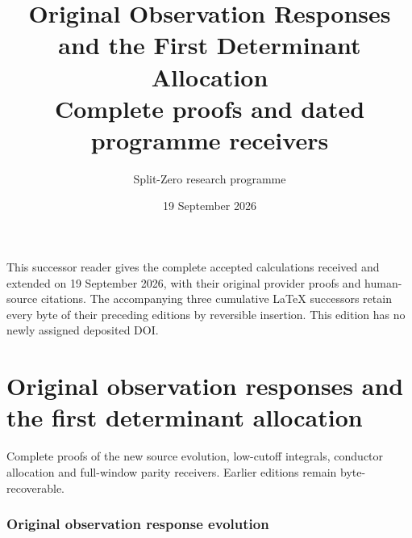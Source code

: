 \documentclass[11pt,a4paper]{article}
\title{Original Observation Responses and the First Determinant Allocation\\[0.6em]\large Complete proofs and dated programme receivers}
\author{Split-Zero research programme}
\date{19 September 2026}
\providecommand{\diag}{\operatorname{diag}}
\providecommand{\Tr}{\operatorname{Tr}}
\providecommand{\norm}[1]{\left\lVert#1\right\rVert}
\begin{document}
\maketitle
\noindent This successor reader gives the complete accepted calculations received and
extended on 19 September 2026, with their original provider proofs and
human-source citations. The accompanying three cumulative LaTeX successors
retain every byte of their preceding editions by reversible insertion.
This edition has no newly assigned deposited DOI.
\tableofcontents
\begingroup
\clearpage
\part{Original observation responses and the first determinant allocation}
\noindent Complete proofs of the new source evolution, low-cutoff integrals, conductor allocation and full-window parity receivers. Earlier editions remain byte-recoverable.
\providecommand{\tightlist}{\setlength{\itemsep}{0pt}\setlength{\parskip}{0pt}}
\providecommand{\C}{\mathbb C}\providecommand{\R}{\mathbb R}
\providecommand{\Z}{\mathbb Z}\providecommand{\Q}{\mathbb Q}
\providecommand{\N}{\mathbb N}
\providecommand{\im}{\operatorname{im}}
\providecommand{\diag}{\operatorname{diag}}
\providecommand{\Gr}{\operatorname{Gram}}
\providecommand{\Gram}{\operatorname{Gram}}
\providecommand{\Res}{\operatorname{Res}}
\providecommand{\cond}{\operatorname{cond}}
\providecommand{\ExtensionTok}[1]{#1}\providecommand{\NormalTok}[1]{#1}
\providecommand{\StringTok}[1]{#1}\providecommand{\BuiltInTok}[1]{#1}
\providecommand{\ControlFlowTok}[1]{#1}

\clearpage
\begingroup
\def\C{\mathbb C}
\def\im{\operatorname{im}}
\def\Tr{\operatorname{Tr}}
\def\norm#1{\left\lVert#1\right\rVert}

\setcounter{equation}{0}
\renewcommand{\theequation}{A04ORE.\arabic{equation}}
\section*{Original observation response evolution}
\end{document}
